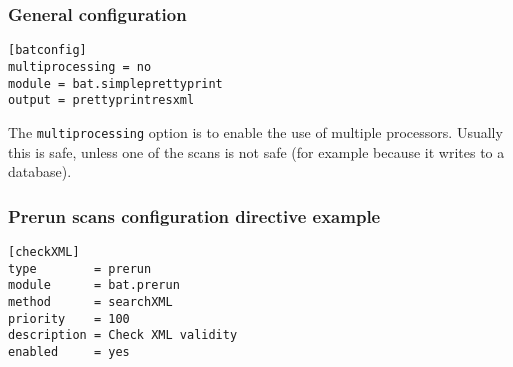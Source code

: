 \documentclass[11pt]{beamer}
\begin{document}
\begin{frame}[fragile]
\frametitle{General configuration}

\begin{verbatim}
[batconfig]
multiprocessing = no
module = bat.simpleprettyprint
output = prettyprintresxml
\end{verbatim}

The \texttt{multiprocessing} option is to enable the use of multiple processors. Usually this is safe, unless one of the scans is not safe (for example because it writes to a database).


\end{frame}



\begin{frame}[fragile]
\frametitle{Prerun scans configuration directive example}

\begin{verbatim}
[checkXML]
type        = prerun
module      = bat.prerun
method      = searchXML
priority    = 100
description = Check XML validity
enabled     = yes
\end{verbatim}

\end{frame}
\end{document}
